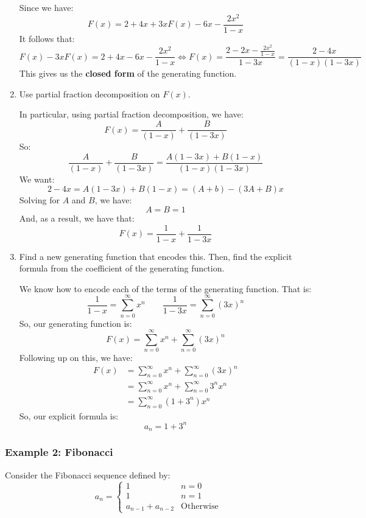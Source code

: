 \documentclass[letterpaper]{article}
\begin{document}
\begin{enumerate}[(1)]
    \bigskip 

    Since we have:
    \[F(x) = 2 + 4x + 3xF(x) - 6x - \frac{2x^2}{1 - x}\]
    It follows that: 
    \[F(x) - 3xF(x) = 2 + 4x - 6x - \frac{2x^2}{1 - x} \iff F(x) = \frac{2 - 2x - \frac{2x^2}{1 - x}}{1 - 3x} = \boxed{\frac{2 - 4x}{(1 - x)(1 - 3x)}}\]
    This gives us the \textbf{closed form} of the generating function. 

    \item Use partial fraction decomposition on $F(x)$. 
    
    \bigskip 
    
    In particular, using partial fraction decomposition, we have:
    \[F(x) = \frac{A}{(1 - x)} + \frac{B}{(1 - 3x)}\]
    So:
    \[\frac{A}{(1 - x)} + \frac{B}{(1 - 3x)} = \frac{A(1 - 3x) + B(1 - x)}{(1 - x)(1 - 3x)}\]
    We want:
    \[2 - 4x = A(1 - 3x) + B(1 - x) = (A + b) - (3A + B)x\]
    Solving for $A$ and $B$, we have:
    \[A = B = 1\]
    And, as a result, we have that:
    \[F(x) = \frac{1}{1 - x} + \frac{1}{1 - 3x}\]

    \item Find a new generating function that encodes this. Then, find the explicit formula from the coefficient of the generating function. 
    
    \bigskip 
    
    We know how to encode each of the terms of the generating function. That is:
    \[\frac{1}{1 - x} = \sum_{n = 0}^{\infty} x^n \qquad \frac{1}{1 - 3x} = \sum_{n = 0}^{\infty} (3x)^n\]
    So, our generating function is:
    \[F(x) = \sum_{n = 0}^{\infty} x^n + \sum_{n = 0}^{\infty} (3x)^n\] 
    Following up on this, we have:
    \begin{equation*}
        \begin{aligned}
            F(x) &= \sum_{n = 0}^{\infty} x^n + \sum_{n = 0}^{\infty} (3x)^n \\ 
                &= \sum_{n = 0}^{\infty} x^n + \sum_{n = 0}^{\infty} 3^n x^n \\ 
                &= \sum_{n = 0}^{\infty} \boxed{(1 + 3^n)} x^n
        \end{aligned}
    \end{equation*}
    So, our explicit formula is:
    \[a_n = 1 + 3^n\]
\end{enumerate}

\subsubsection{Example 2: Fibonacci}
Consider the Fibonacci sequence defined by:
\[a_n = \begin{cases}
    1 & n = 0 \\ 
    1 & n = 1 \\ 
    a_{n - 1} + a_{n - 2} & \text{Otherwise}
\end{cases}\]
\end{document}
